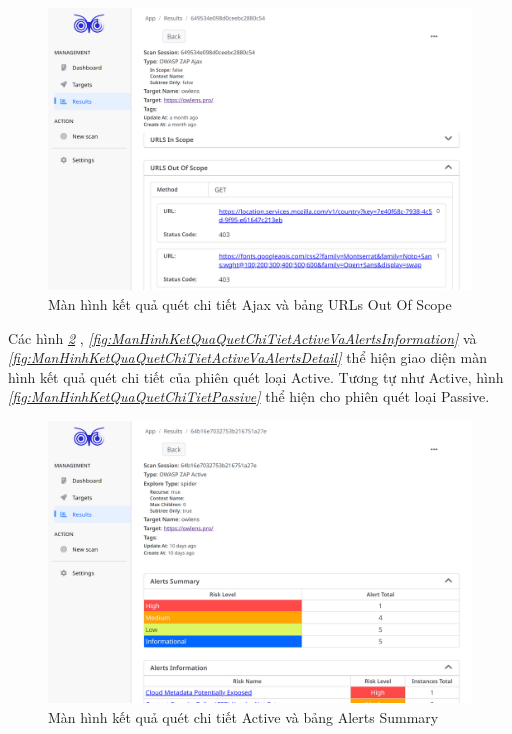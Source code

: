 \begin{figure}[H]
      \centering
      \includegraphics[width=\textwidth]{applied-thesis-chapters/chapter-6/Màn hình kết quả quét chi tiết Ajax và bảng URLs Out Of Scope.png}
      \caption{Màn hình kết quả quét chi tiết Ajax và bảng URLs Out Of Scope}
      \label{fig:ManHinhKetQuaQuetChiTietAjaxVaURLsOutOfScope}
\end{figure}

Các hình \textit{\ref{fig:ManHinhKetQuaQuetChiTietActiveVaAlertsSummary} }
, \textit{\ref{fig:ManHinhKetQuaQuetChiTietActiveVaAlertsInformation} } 
và \textit{\ref{fig:ManHinhKetQuaQuetChiTietActiveVaAlertsDetail} } 
thể hiện giao diện màn hình kết quả quét chi tiết của phiên quét loại Active.
Tương tự như Active, hình \textit{\ref{fig:ManHinhKetQuaQuetChiTietPassive} } 
thể hiện cho phiên quét loại Passive.

\begin{figure}[H]
      \centering
      \includegraphics[width=\textwidth]{applied-thesis-chapters/chapter-6/Màn hình kết quả quét chi tiết Active và bảng Alerts Summary.png}
      \caption{Màn hình kết quả quét chi tiết Active và bảng Alerts Summary}
      \label{fig:ManHinhKetQuaQuetChiTietActiveVaAlertsSummary}
\end{figure}

